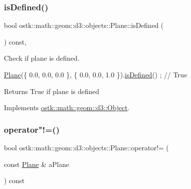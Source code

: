 \subsubsection{\texorpdfstring{is\+Defined()}{isDefined()}}
{\footnotesize\ttfamily bool ostk\+::math\+::geom\+::d3\+::objects\+::\+Plane\+::is\+Defined (\begin{DoxyParamCaption}{ }\end{DoxyParamCaption}) const\hspace{0.3cm}{\ttfamily [override]}, {\ttfamily [virtual]}}



Check if plane is defined. 


\begin{DoxyCode}
\hyperlink{classostk_1_1math_1_1geom_1_1d3_1_1objects_1_1_plane_ac66c2a3b3d9d7cd1fd507123091bb38f}{Plane}(\{ 0.0, 0.0, 0.0 \}, \{ 0.0, 0.0, 1.0 \}).\hyperlink{classostk_1_1math_1_1geom_1_1d3_1_1objects_1_1_plane_a62401be167d9574a4b20f2a88f7d6c79}{isDefined}() ; \textcolor{comment}{// True}
\end{DoxyCode}


\begin{DoxyReturn}{Returns}
True if plane is defined 
\end{DoxyReturn}


Implements \hyperlink{classostk_1_1math_1_1geom_1_1d3_1_1_object_a271a1964cd208be85ce9a0a429395ad8}{ostk\+::math\+::geom\+::d3\+::\+Object}.

\mbox{\label{classostk_1_1math_1_1geom_1_1d3_1_1objects_1_1_plane_a3e2df19f391e163bba7f7be079d19826}} 
\subsubsection{\texorpdfstring{operator"!=()}{operator!=()}}
{\footnotesize\ttfamily bool ostk\+::math\+::geom\+::d3\+::objects\+::\+Plane\+::operator!= (\begin{DoxyParamCaption}\item[{const \hyperlink{classostk_1_1math_1_1geom_1_1d3_1_1objects_1_1_plane}{Plane} \&}]{a\+Plane }\end{DoxyParamCaption}) const}




